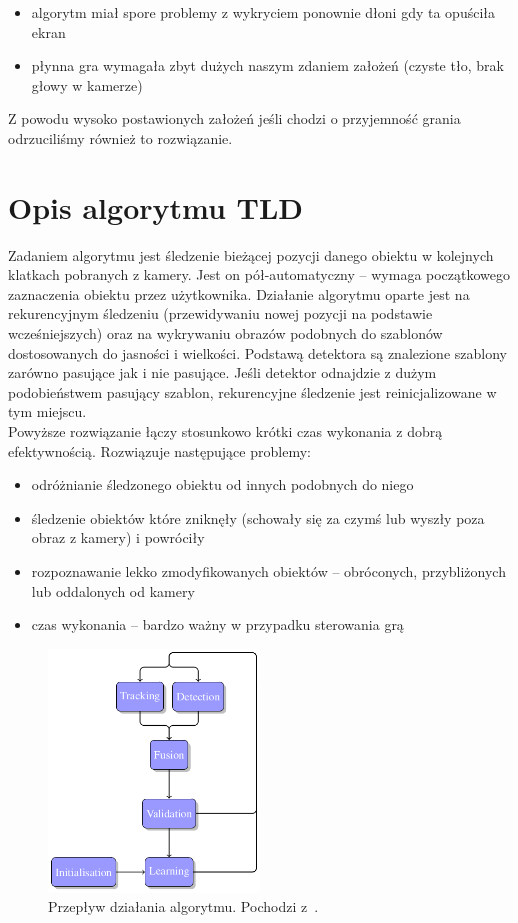 \documentclass{article}
\newenvironment{tightlist}{
\begin{itemize}
  \setlength{\itemsep}{1pt}
  \setlength{\parskip}{0pt}
  \setlength{\parsep}{0pt}}
{\end{itemize}}
\begin{document}
\begin{tightlist}
\item{algorytm miał spore problemy z wykryciem ponownie dłoni gdy ta opuściła ekran}
\item{płynna gra wymagała zbyt dużych naszym zdaniem założeń (czyste tło, brak głowy w kamerze)}
\end{tightlist}

Z powodu wysoko postawionych założeń jeśli chodzi o przyjemność grania odrzuciliśmy również to rozwiązanie.

\section{Opis algorytmu TLD} \label{TLD}

Zadaniem algorytmu jest śledzenie bieżącej pozycji danego obiektu w kolejnych klatkach pobranych z kamery. Jest on pół-automatyczny -- wymaga początkowego zaznaczenia obiektu przez użytkownika.
Działanie algorytmu oparte jest na rekurencyjnym śledzeniu (przewidywaniu nowej pozycji na podstawie wcześniejszych)
oraz na wykrywaniu obrazów podobnych do szablonów dostosowanych do jasności i wielkości.
Podstawą detektora są znalezione szablony zarówno pasujące jak i nie pasujące. Jeśli detektor odnajdzie z dużym podobieństwem pasujący szablon,
rekurencyjne śledzenie jest reinicjalizowane w tym miejscu. \\

Powyższe rozwiązanie łączy stosunkowo krótki czas wykonania z dobrą efektywnością. Rozwiązuje następujące problemy:

\begin{tightlist}
\item odróżnianie śledzonego obiektu od innych podobnych do niego
\item śledzenie obiektów które zniknęły (schowały się za czymś lub wyszły poza obraz z kamery) i powróciły
\item rozpoznawanie lekko zmodyfikowanych obiektów -- obróconych, przybliżonych lub oddalonych od kamery
\item czas wykonania -- bardzo ważny w przypadku sterowania grą
\end{tightlist}

\begin{figure}[!ht]
\centering
\includegraphics[width=0.5\textwidth]{alg_flow.png}
\caption{Przepływ działania algorytmu. Pochodzi z~\cite{TLD-thesis}.}
\label{fig:flow}
\end{figure}
\end{document}

